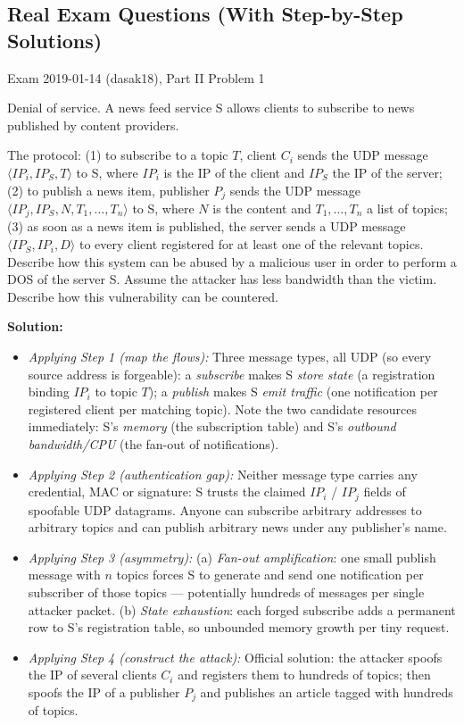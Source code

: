 \documentclass[12pt, a4paper]{article}
\begin{document}
\subsection*{Real Exam Questions (With Step-by-Step Solutions)}

\begin{practicebox}{Exam 2019-01-14 (dasak18), Part II Problem 1}
\begin{problembox}
Denial of service. A news feed service S allows clients to subscribe to news published by content providers.

The protocol: (1) to subscribe to a topic $T$, client $C_i$ sends the UDP message $\langle IP_i, IP_S, T \rangle$ to S, where $IP_i$ is the IP of the client and $IP_S$ the IP of the server; (2) to publish a news item, publisher $P_j$ sends the UDP message $\langle IP_j, IP_S, N, T_1, \dots, T_n \rangle$ to S, where $N$ is the content and $T_1, \dots, T_n$ a list of topics; (3) as soon as a news item is published, the server sends a UDP message $\langle IP_S, IP_i, D \rangle$ to every client registered for at least one of the relevant topics.
Describe how this system can be abused by a malicious user in order to perform a DOS of the server S. Assume the attacker has less bandwidth than the victim. Describe how this vulnerability can be countered.
\end{problembox}

\textbf{Solution:}
\begin{itemize}
    \item \textit{Applying Step 1 (map the flows):} Three message types, all UDP (so every source address is forgeable): a \emph{subscribe} makes S \emph{store state} (a registration binding $IP_i$ to topic $T$); a \emph{publish} makes S \emph{emit traffic} (one notification per registered client per matching topic).
    Note the two candidate resources immediately: S's \emph{memory} (the subscription table) and S's \emph{outbound bandwidth/CPU} (the fan-out of notifications).
    \item \textit{Applying Step 2 (authentication gap):} Neither message type carries any credential, MAC or signature: S trusts the claimed $IP_i$ / $IP_j$ fields of spoofable UDP datagrams. Anyone can subscribe arbitrary addresses to arbitrary topics and can publish arbitrary news under any publisher's name.
    \item \textit{Applying Step 3 (asymmetry):} (a) \emph{Fan-out amplification}: one small publish message with $n$ topics forces S to generate and send one notification per subscriber of those topics --- potentially hundreds of messages per single attacker packet. (b) \emph{State exhaustion}: each forged subscribe adds a permanent row to S's registration table, so unbounded memory growth per tiny request.
    \item \textit{Applying Step 4 (construct the attack):} Official solution: the attacker spoofs the IP of several clients $C_i$ and registers them to hundreds of topics; then spoofs the IP of a publisher $P_j$ and publishes an article tagged with hundreds of topics.


\end{itemize}
\end{practicebox}
\end{document}
